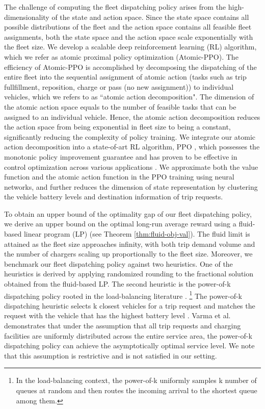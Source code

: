 The challenge of computing the fleet dispatching policy arises from the high-dimensionality of the state and action space. Since the state space contains all possible distributions of the fleet and the action space contains all feasible fleet assignments, both the state space and the action space scale exponentially with the fleet size. We develop a scalable deep reinforcement learning (RL) algorithm, which we refer as atomic proximal policy optimization (Atomic-PPO). The efficiency of Atomic-PPO is accomplished by decomposing the dispatching of the entire fleet into the sequential assignment of atomic action (tasks such as trip fullfillment, reposition, charge or pass (no new assignment)) to individual vehicles, which we refers to as ``atomic action decomposition". The dimension of the atomic action space equals to the number of feasible tasks that can be assigned to an individual vehicle. Hence, the atomic action decomposition reduces the action space from being exponential in fleet size to being a constant, significantly reducing the complexity of policy training. We integrate our atomic action decomposition into a state-of-art RL algorithm, PPO \citep{schulman2017proximal}, which possesses the monotonic policy improvement guarantee and has proven to be effective in control optimization across various applications \citep{vinyals2019grandmaster, berner2019dota, simm2020reinforcement, zoph2018learning, akkaya2019solving}. We approximate both the value function and the atomic action function in the PPO training using neural networks, and further reduces the dimension of state representation by clustering the vehicle battery levels and destination information of trip requests.

To obtain an upper bound of the optimality gap of our fleet dispatching policy, we derive an upper bound on the optimal long-run average reward using a fluid-based linear program (LP) (see Theorem \ref{thm:fluid-obj-val}). The fluid limit is attained as the fleet size approaches infinity, with both trip demand volume and the number of chargers scaling up proportionally to the fleet size. Moreover, we benchmark our fleet dispatching policy against two heuristics. One of the heuristics is derived by applying randomized rounding to the fractional solution obtained from the fluid-based LP. The second heuristic is the power-of-k dispatching policy rooted in the load-balancing literature \citep{vvedenskaya1996queueing, mitzenmacher1996load}. \footnote{In the load-balancing context, the power-of-k uniformly samples k number of queues at random and then routes the incoming arrival to the shortest queue among them.} The power-of-k dispatching heuristic selects k closest vehicles for a trip request and matches the request with the vehicle that has the highest battery level \citep{varma2023electric}. Varma et al. demonstrates that under the assumption that all trip requests and charging facilities are uniformly distributed across the entire service area, the power-of-k dispatching policy can achieve the asymptotically optimal service level. We note that this assumption is restrictive and is not satisfied in our setting.

